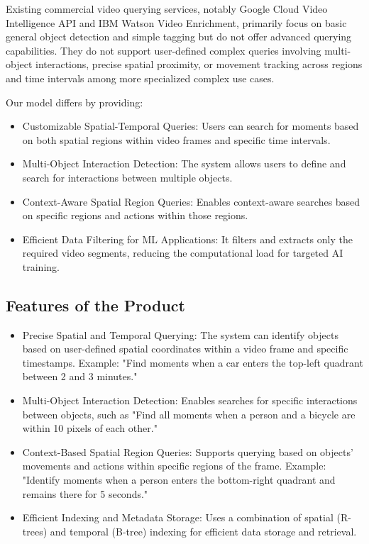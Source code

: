 \documentclass[conference]{IEEEtran}
\begin{document}
Existing commercial video querying services, notably Google Cloud Video Intelligence API\cite{google_video_intelligence} and IBM Watson Video Enrichment\cite{ibm_watson_video_enrichment}, primarily focus on basic general object detection and simple tagging but do not offer advanced querying capabilities. They do not support user-defined complex queries involving multi-object interactions, precise spatial proximity, or movement tracking across regions and time intervals among more specialized complex use cases.

Our model differs by providing:

\begin{itemize}
    \item Customizable Spatial-Temporal Queries: Users can search for moments based on both spatial regions within video frames and specific time intervals.
    \item Multi-Object Interaction Detection: The system allows users to define and search for interactions between multiple objects.
    \item  Context-Aware Spatial Region Queries: Enables context-aware searches based on specific regions and actions within those regions.
    \item Efficient Data Filtering for ML Applications: It filters and extracts only the required video segments, reducing the computational load for targeted AI training.
\end{itemize}

\subsection{Features of the Product}

\begin{itemize}
    \item Precise Spatial and Temporal Querying: The system can identify objects based on user-defined spatial coordinates within a video frame and specific timestamps. Example: "Find moments when a car enters the top-left quadrant between 2 and 3 minutes."
    \item Multi-Object Interaction Detection: Enables searches for specific interactions between objects, such as "Find all moments when a person and a bicycle are within 10 pixels of each other."
    \item Context-Based Spatial Region Queries: Supports querying based on objects' movements and actions within specific regions of the frame. Example: "Identify moments when a person enters the bottom-right quadrant and remains there for 5 seconds."
    \item Efficient Indexing and Metadata Storage: Uses a combination of spatial (R-trees) and temporal (B-tree) indexing for efficient data storage and retrieval.
\end{itemize}
\end{document}
